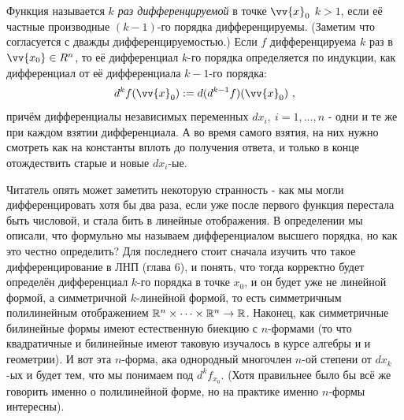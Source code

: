 \begin{definition}
	Функция называется \textit{$k$ раз дифференцируемой} в точке $\vv{x}_0$ $k>1$, если её частные производные $(k - 1)$-го порядка дифференцируемы. (Заметим что согласуется с дважды дифференцируемостью.) Если $f$ дифференцируема $k$ раз в $\vv{x_0} \in R^n$, то её дифференциал $k$-го порядка определяется по индукции, как дифференциал от её дифференциала $k-1$-го порядка:
	\[
		d^k f(\vv{x}_0) := d(d^{k - 1} f)(\vv{x}_0)\ ,
	\] причём дифференциалы независимых переменных $dx_i, \  i =1,...,n$ - одни и те же при каждом взятии дифференциала. А во время самого взятия, на них нужно смотреть как на константы вплоть до получения ответа, и только в конце отождествить старые и новые $dx_i$-ые.
	
	\begin{anote}
		Читатель опять может заметить некоторую странность - как мы могли дифференцировать хотя бы два раза, если уже после первого функция перестала быть числовой, и стала бить в линейные отображения. В определении мы описали, что формульно мы называем дифференциалом высшего порядка, но как это честно определить? Для последнего стоит сначала изучить что такое дифференцирование в ЛНП (глава 6), и понять, что тогда корректно будет определён дифференциал $k$-го порядка в точке $x_0$, и он будет уже не линейной формой, а симметричной $k$-линейной формой, то есть симметричным полилинейным отображением $\mathbb{R}^n\times\dots\times\mathbb{R}^n\to\mathbb{R}$. Наконец, как симметричные билинейные формы имеют естественную биекцию с $n$-формами (то что квадратичные и билинейные имеют таковую изучалось в курсе алгебры и и геометрии). И вот эта $n$-форма, ака однородный многочлен $n$-ой степени от $dx_k$-ых и будет тем, что мы понимаем под $d^kf_{x_0}$. (Хотя правильнее было бы всё же говорить именно о полилинейной форме, но на практике именно $n$-формы интересны).
	\end{anote}
	

\end{definition}
